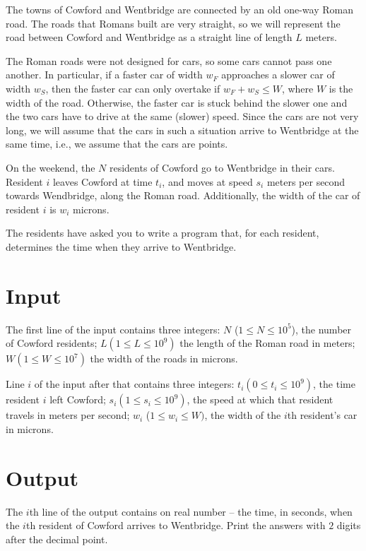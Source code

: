 The towns of Cowford and Wentbridge are connected by an old one-way Roman road.
The roads that Romans built are very straight, so we will represent the road between Cowford and Wentbridge as a straight line of length $L$ meters.

The Roman roads were not designed for cars, so some cars cannot pass one another.
In particular, if a faster car of width $w_F$ approaches a slower car of width $w_S$, then the faster car can only overtake if $w_F + w_S \leq W$,
where $W$ is the width of the road.
Otherwise, the faster car is stuck behind the slower one and the two cars have to drive at the same (slower) speed.
Since the cars are not very long, we will assume that the cars in such a situation arrive to Wentbridge at the same time, i.e., we assume that the cars are points.

On the weekend, the $N$ residents of Cowford go to Wentbridge in their cars.
Resident $i$ leaves Cowford at time $t_i$, and moves at speed $s_i$ meters per second towards Wendbridge, along the Roman road.
Additionally, the width of the car of resident $i$ is $w_i$ microns.

The residents have asked you to write a program that, for each resident, determines the time when they arrive to Wentbridge.

\section*{Input}
The first line of the input contains three integers: $N$ ($1 \leq N \leq 10^5$), the number of Cowford residents; $L (1 \leq L \leq 10^9)$ the length of the Roman road in meters; $W (1 \leq W \leq 10^7)$ the width of the roads in microns.

Line $i$ of the input after that contains three integers:
$t_i (0 \leq t_i \leq 10^9)$, the time resident $i$ left Cowford;
$s_i (1 \leq s_i \leq 10^9)$, the speed at which that resident travels in meters per second;
$w_i$ ($1 \leq w_i \leq W)$, the width of the $i$th resident's car in microns.

\section*{Output}
The $i$th line of the output contains on real number
-- the time, in seconds, when the $i$th resident of Cowford arrives to Wentbridge.
Print the answers with $2$ digits after the decimal point.